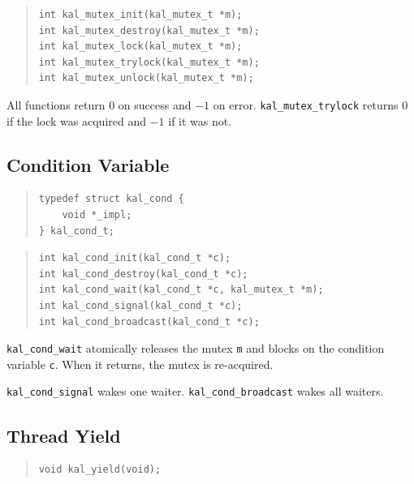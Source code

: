 \documentclass[11pt,twoside]{article}
\begin{document}
\begin{quote}
\begin{verbatim}
int kal_mutex_init(kal_mutex_t *m);
int kal_mutex_destroy(kal_mutex_t *m);
int kal_mutex_lock(kal_mutex_t *m);
int kal_mutex_trylock(kal_mutex_t *m);
int kal_mutex_unlock(kal_mutex_t *m);
\end{verbatim}
\end{quote}

All functions return $0$ on success and $-1$ on error.
{\tt kal\_mutex\_trylock} returns $0$ if the lock was acquired
and $-1$ if it was not.

\subsection{Condition Variable}

\begin{quote}
\begin{verbatim}
typedef struct kal_cond {
    void *_impl;
} kal_cond_t;
\end{verbatim}
\end{quote}

\begin{quote}
\begin{verbatim}
int kal_cond_init(kal_cond_t *c);
int kal_cond_destroy(kal_cond_t *c);
int kal_cond_wait(kal_cond_t *c, kal_mutex_t *m);
int kal_cond_signal(kal_cond_t *c);
int kal_cond_broadcast(kal_cond_t *c);
\end{verbatim}
\end{quote}

{\tt kal\_cond\_wait} atomically releases the mutex {\tt m} and
blocks on the condition variable {\tt c}.  When it returns, the
mutex is re-acquired.

{\tt kal\_cond\_signal} wakes one waiter.
{\tt kal\_cond\_broadcast} wakes all waiters.

\subsection{Thread Yield}

\begin{quote}
\begin{verbatim}
void kal_yield(void);
\end{verbatim}
\end{quote}
\end{document}
